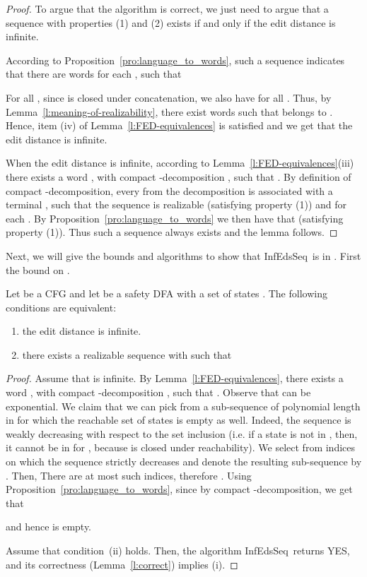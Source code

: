 \documentclass{CSML}
\newcommand{\algoFEDPDADFA}{\textsf{InfEdsSeq}}
\begin{document}
\begin{proof}
To argue that the algorithm is correct, we just need to argue that a sequence with properties (1) and (2) exists if and only if the edit distance is infinite.

\smallskip{}
According to Proposition~\ref{pro:language_to_words}, such a sequence indicates that there are words  for each , such that 

For all , since  is closed under concatenation, we also have  for all .
Thus, by Lemma~\ref{l:meaning-of-realizability}, there exist words  such that
 belongs to .
Hence, item (iv) of Lemma~\ref{l:FED-equivalences} is satisfied and we get that the edit distance is infinite. 

\smallskip{}
When the edit distance is infinite, according to Lemma~\ref{l:FED-equivalences}(iii) there exists a word , with compact -decomposition
, such that
. 
By definition of compact -decomposition, every  from the decomposition is associated with a terminal , such that the sequence  is realizable (satisfying property (1)) and  for each . By Proposition~\ref{pro:language_to_words} we then have that  (satisfying property (1)). Thus such a sequence always exists and the lemma follows.
\end{proof}

Next, we will give the bounds and algorithms to show that \algoFEDPDADFA\ is in . First the bound on . 
\begin{lem}\label{l:bound_k}
Let  be a CFG and let  be a safety DFA with a set of states .
The following conditions are equivalent:
\begin{enumerate}[label=(\roman*)]
\item the edit distance  is infinite.
\item there exists a realizable sequence  with 
such that 
\end{enumerate}
\end{lem}
\begin{proof}
Assume that  is infinite. By Lemma~\ref{l:FED-equivalences},
there exists a word , with compact -decomposition
, such that
. Observe that  can be exponential. We claim that we can 
pick from  a sub-sequence 
of polynomial length in  for which the reachable set of states is empty as well.
Indeed, the sequence 
is weakly decreasing with respect to the set inclusion (i.e. if a state is not in , then, it cannot be in  for , because  is closed under reachability). 
We select from  indices  on which the sequence   
strictly decreases and denote the resulting sub-sequence by . 
Then, 
There are at most  such indices, therefore .
Using Proposition~\ref{pro:language_to_words}, since  by compact -decomposition,  we get that

and hence is empty.

Assume that condition~(ii) holds. Then, the algorithm \algoFEDPDADFA\ returns YES, and its correctness (Lemma~\ref{l:correct}) implies (i).
\end{proof}
\end{document}
